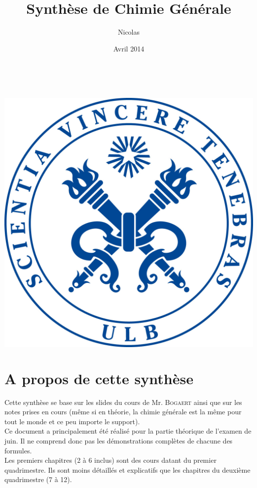 \documentclass[12pt, a4paper]{article}
\author{Nicolas \bsc{Englebert}}
\title{Synthèse de Chimie Générale}
\date{Avril 2014}
\begin{document}
\renewcommand{\proofname}{Démonstration}
\maketitle
\tableofcontents
\ \\ 
\begin{center}
\includegraphics[scale=0.06]{ulb.jpg}
\end{center}
\newpage

\section{A propos de cette synthèse}
Cette synthèse se base sur les slides du cours de Mr. \textsc{Bogaert} ainsi que sur les notes prises en cours (même si en théorie, la chimie générale est la même pour tout le monde et ce peu importe le support).\\

Ce document a principalement été réalisé pour la partie théorique de l'examen de juin. Il ne comprend donc pas les démonstrations complètes de chacune des formules.\\

Les premiers chapitres (2 à 6 inclus) sont des cours datant du premier quadrimestre. Ils sont moins détaillés et explicatifs que les chapitres du deuxième quadrimestre (7 à 12).\\
\end{document}
